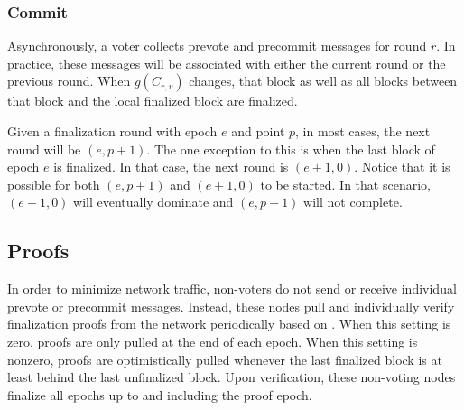 \subsubsection{Commit}

Asynchronously, a voter collects prevote and precommit messages for round $r$.
In practice, these messages will be associated with either the current round or the previous round.
When $g(C_{r,v})$ changes, that block as well as all blocks between that block and the local finalized block are finalized.

Given a finalization round with epoch $e$ and point $p$, in most cases, the next round will be $(e, p + 1)$.
The one exception to this is when the last block of epoch $e$ is finalized.
In that case, the next round is $(e + 1, 0)$.
Notice that it is possible for both $(e, p + 1)$ and $(e + 1, 0)$ to be started.
In that scenario, $(e + 1, 0)$ will eventually dominate and $(e, p + 1)$ will not complete.

\subsection{Proofs}

In order to minimize network traffic, non-voters do not send or receive individual prevote or precommit messages.
Instead, these nodes pull and individually verify finalization proofs from the network periodically based on .
When this setting is zero, proofs are only pulled at the end of each epoch.
When this setting is nonzero, proofs are optimistically pulled whenever the last finalized block is at least  behind the last unfinalized block.
Upon verification, these non-voting nodes finalize all epochs up to and including the proof epoch.

